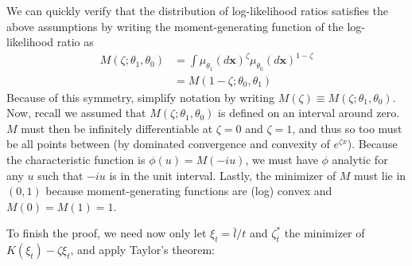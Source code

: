 \documentclass{fancyArticle}
\renewcommand{\|}{\,|\,}                    %
\providecommand{\;}{\,;}                    %
\begin{document}
\begin{appendix}
  We can quickly verify that the distribution of log-likelihood ratios satisfies the above assumptions by writing the moment-generating function of the log-likelihood ratio as
  \begin{align*}
    M(\zeta;\theta_{1},\theta_{0}) & = \int \mu_{\theta_1}
                       {(d \mathbf{x})}^{\zeta} {\mu_{\theta_0}(d \mathbf{x})}^{1-\zeta}\\
                     & = M(1-\zeta;\theta_0,\theta_1)
  \end{align*}
  Because of this symmetry, simplify notation by writing $M(\zeta)\equiv M(\zeta;\theta_1,\theta_0)$.
  Now, recall we assumed that $M(\zeta;\theta_1,\theta_0)$ is defined on an interval around zero. $M$ must then be infinitely differentiable at $\zeta=0$ and $\zeta=1$, and thus so too must be all points between (by dominated convergence and convexity of $e^{\zeta x}$).
  Because the characteristic function is $\phi(u)=M(-iu)$, we must have $\phi$ analytic for any $u$ such that $-iu$ is in the unit interval.
  Lastly, the minimizer of $M$ must lie in $(0,1)$ because moment-generating functions are (log) convex and $M(0)=M(1)=1$.

  To finish the proof, we need now only let $\xi_t=\bar{l}/t$ and $\zeta_t^{*}$ the minimizer of $K(\xi_t)-\zeta\xi_t$, and apply Taylor's theorem:


\end{appendix}
\end{document}
